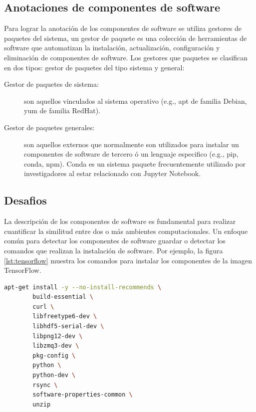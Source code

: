 \subsection{Anotaciones de componentes de software}\label{s4.2.2}


Para lograr la anotación de los componentes de software se utiliza gestores de paquetes del sistema, un gestor de paquete es una colección de herramientas de software que automatizan la instalación, actualización, configuración y eliminación de componentes de software. 
Los gestores que paquetes se clasifican en dos tipos: gestor de paquetes del tipo sistema y general:

\begin{description}
	\item  [Gestor de paquetes de sistema:] son aquellos vinculados al sistema operativo (e.g., apt de familia Debian, yum de familia RedHat).
	\item [Gestor de paquetes generales:] son aquellos externos que normalmente son utilizados para instalar un componentes de software de tercero ó un lenguaje especifico (e.g., pip, conda, npm). Conda es un sistema paquete frecuentemente utilizado por investigadores al estar relacionado con Jupyter Notebook.
\end{description}


\subsection{Desafios}\label{s4.2.2}

La descripción de los componentes de software es fundamental para realizar cuantificar la similitud entre dos o más ambientes computacionales.
Un enfoque común para detectar los componentes de software guardar o detectar los comandos que realizan la instalación de software. Por ejemplo, la figura \ref{lst:tensorflow} muestra los comandos para instalar los componentes de la imagen TensorFlow. 

\begin{lstlisting}[caption={Ejemplo de instalación de dependencias para la imagen TensorFlow},label={lst:tensorflow},language=bash]
apt-get install -y --no-install-recommends \
        build-essential \
        curl \
        libfreetype6-dev \
        libhdf5-serial-dev \
        libpng12-dev \
        libzmq3-dev \
        pkg-config \
        python \
        python-dev \
        rsync \
        software-properties-common \
        unzip	
\end{lstlisting}



